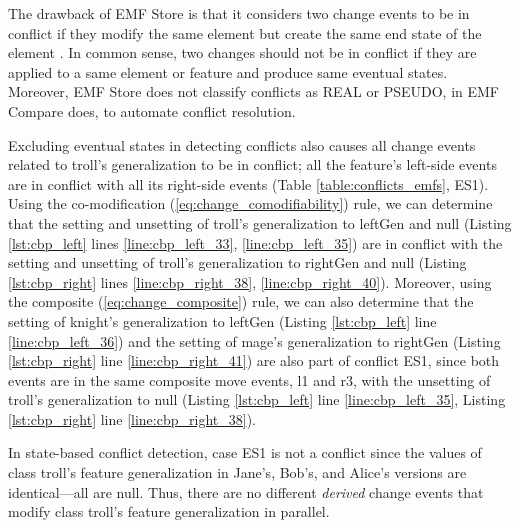 The drawback of EMF Store is that it considers two change events to be in conflict if they modify the same element but create the same end state of the element \cite{DBLP:conf/sfm/BroschKLSWW12}. In common sense, two changes should not be in conflict if they are applied to a same element or feature and produce same eventual states. Moreover, EMF Store does not classify conflicts as \textsf{REAL} or \textsf{PSEUDO}, in EMF Compare does, to automate conflict resolution.


Excluding eventual states in detecting conflicts also causes all change events related to \textsf{troll}’s \textsf{generalization} to be in conflict; all the feature’s left-side events are in conflict with all its right-side events (Table \ref{table:conflicts_emfs}, ES1). Using the co-modification (\ref{eq:change_comodifiability}) rule, we can determine that the setting and unsetting of \textsf{troll}’s \textsf{generalization} to \textsf{leftGen} and \textsf{null} (Listing \ref{lst:cbp_left} lines \ref{line:cbp_left_33}, \ref{line:cbp_left_35}) are in conflict with the setting and unsetting of \textsf{troll}’s \textsf{generalization} to \textsf{rightGen} and \textsf{null} (Listing \ref{lst:cbp_right} lines \ref{line:cbp_right_38}, \ref{line:cbp_right_40}). Moreover, using the composite (\ref{eq:change_composite}) rule, we can also determine that the setting of \textsf{knight}’s \textsf{generalization} to \textsf{leftGen} (Listing \ref{lst:cbp_left} line \ref{line:cbp_left_36}) and the setting of \textsf{mage}’s \textsf{generalization} to \textsf{rightGen} (Listing \ref{lst:cbp_right} line \ref{line:cbp_right_41}) are also part of conflict ES1, since both events are in the same composite move events, \textsf{l1} and \textsf{r3}, with the unsetting of \textsf{troll}’s \textsf{generalization} to \textsf{null} (Listing \ref{lst:cbp_left} line \ref{line:cbp_left_35}, Listing \ref{lst:cbp_right} line \ref{line:cbp_right_38}).

In state-based conflict detection, case ES1 is not a conflict since the values of class \textsf{troll}’s feature \textsf{generalization} in Jane’s, Bob’s, and Alice’s versions are identical—all are null. Thus, there are no different \textit{derived} change events that modify class \textsf{troll}’s feature \textsf{generalization} in parallel.

